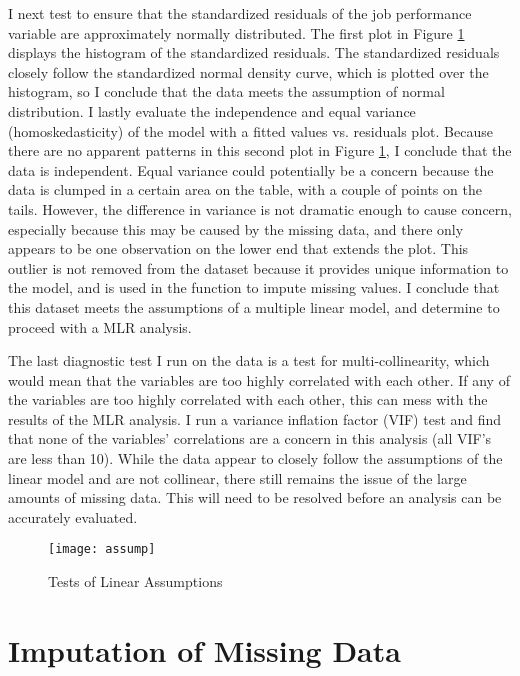 \documentclass{svproc}
\begin{document}
I next test to ensure that the standardized residuals of the job performance variable are approximately normally distributed. The first plot in Figure \ref{assump} displays the histogram of the standardized residuals. The standardized residuals closely follow the standardized normal density curve, which is plotted over the histogram, so I conclude that the data meets the assumption of normal distribution. I lastly evaluate the independence and equal variance (homoskedasticity) of the model with a fitted values vs. residuals plot. Because there are no apparent patterns in this second plot in Figure \ref{assump}, I conclude that the data is independent. Equal variance could potentially be a concern because the data is clumped in a certain area on the table, with a couple of points on the tails. However, the difference in variance is not dramatic enough to cause concern, especially because this may be caused by the missing data, and there only appears to be one observation on the lower end that extends the plot. This outlier is not removed from the dataset because it provides unique information to the model, and is used in the function to impute missing values. I conclude that this dataset meets the assumptions of a multiple linear model, and determine to proceed with a MLR analysis.

The last diagnostic test I run on the data is a test for multi-collinearity, which would mean that the variables are too highly correlated with each other. If any of the variables are too highly correlated with each other, this can mess with the results of the MLR analysis. I run a variance inflation factor (VIF) test and find that none of the variables' correlations are a concern in this analysis (all VIF's are less than 10). While the data appear to closely follow the assumptions of the linear model and are not collinear, there still remains the issue of the large amounts of missing data. This will need to be resolved before an analysis can be accurately evaluated.

\begin{figure}
\begin{center}
\caption{Tests of Linear Assumptions}
\texttt{[image: assump]}
\label{assump}
\smallskip
\end{center}
\end{figure}

\section{Imputation of Missing Data}
\end{document}
